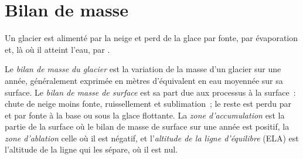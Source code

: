 \section{Bilan de masse}\label{sec:b3:glaciology:mass-balance}

Un glacier est alimenté par la neige et perd de la glace par fonte, par évaporation et, là où il
atteint l'eau, par .

\begin{definition}\label{def:b3:glaciology:mass-balance}
Le \emph{bilan de masse du glacier} est la variation
de la masse d'un glacier sur une année, généralement exprimée en mètres
d'équivalent en eau moyennée sur sa surface. Le \emph{bilan de masse de
surface} est sa part due aux processus à
la surface~: chute de neige moins fonte, ruissellement et sublimation~; le reste est
perdu par  et par fonte à la base ou sous la glace flottante. La
\emph{zone d'accumulation} est la partie de la
surface où le bilan de masse de surface sur une année est positif, la
\emph{zone d'ablation} celle où il est négatif,
et l'\emph{altitude de la ligne d'équilibre}
(ELA) est l'altitude de la ligne qui les sépare, où il est nul.
\end{definition}

